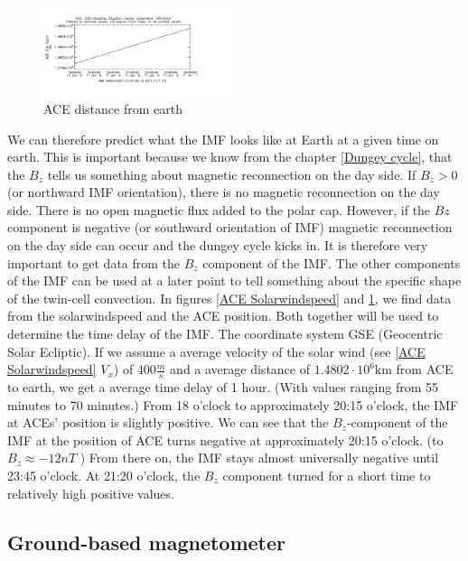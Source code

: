 \documentclass[10pt,a4paper]{article}
\begin{document}
\begin{figure}[h]
\centering
\includegraphics[width=0.5\textwidth]{ACE_distance.pdf}
\caption{ ACE distance from earth \label{ACE distance}}
\end{figure}
We can therefore predict what the IMF looks like at Earth at a given time on earth. This is important because we know from the chapter \ref{Dungey cycle}, that the $B_z$ 
tells us something about magnetic reconnection on the day side. If $B_z>0$ (or northward IMF orientation), there is no magnetic reconnection on the day side. 
There is no open magnetic flux added to the polar cap. However, if the $Bz$ component is negative (or southward orientation of IMF) magnetic reconnection on the day side 
can occur and the dungey cycle kicks in. It is therefore very important to get data from the $B_z$ component of the IMF. The other components of the IMF can be used at a 
later point to tell something about the specific shape of the twin-cell convection. In figures \ref{ACE Solarwindspeed} and \ref{ACE distance}, we find data from 
the solarwindspeed and the ACE position. Both together will be used to determine the time delay of the IMF. The coordinate system GSE (Geocentric Solar Ecliptic). 
If we assume a average velocity of the solar wind (see \ref{ACE Solarwindspeed} $V_x$) of $400 \frac{m}{s}$ and a average distance of $1.4802 \cdot 10^{6} \mathrm{km}$ 
from ACE to earth, we get a average time delay of 1 hour. (With values ranging from 55 minutes to 70 minutes.) From 18 o'clock to approximately 20:15 o'clock, 
the IMF at ACEs' position is slightly positive. We can see that the $B_z$-component of the IMF at the position of ACE turns negative at approximately 20:15 o'clock. 
(to $B_z\approx-12 n T$ ) From there on, the IMF stays almost universally negative until 23:45 o'clock. At 21:20 o'clock, the $B_z$ component turned for a short time 
to relatively high positive values.   

\clearpage
\subsection{Ground-based magnetometer\label{0_CHAPTER_GROUNDBASEDMag}}
\end{document}
